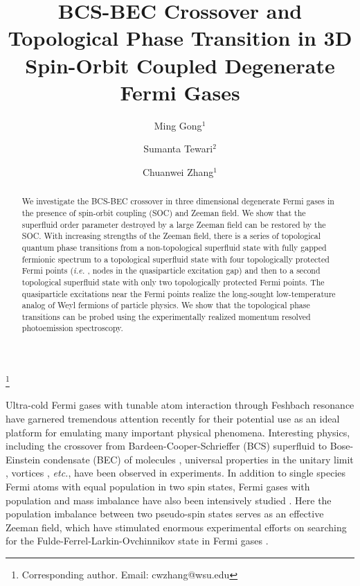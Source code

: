 \documentclass[prl,showpacs,twocolumn]{revtex4-1}
\begin{document}
\title{BCS-BEC Crossover and Topological Phase Transition in 3D Spin-Orbit
Coupled Degenerate Fermi Gases}
\author{Ming Gong$^{1}$}
\author{Sumanta Tewari$^{2}$}
\author{Chuanwei Zhang$^{1}$}
\thanks{Corresponding author. Email: cwzhang@wsu.edu}

\begin{abstract}
We investigate the BCS-BEC crossover in three dimensional degenerate Fermi
gases in the presence of spin-orbit coupling (SOC) and Zeeman field. We show
that the superfluid order parameter destroyed by a large Zeeman field can be
restored by the SOC. With increasing strengths of the Zeeman field, there is
a series of topological quantum phase transitions from a non-topological
superfluid state with fully gapped fermionic spectrum to a topological
superfluid state with four topologically protected Fermi points (\textit{i.e.%
}, nodes in the quasiparticle excitation gap) and then to a second
topological superfluid state with only two topologically protected Fermi
points. The quasiparticle excitations near the Fermi points realize the
long-sought low-temperature analog of Weyl fermions of particle physics. We
show that the topological phase transitions can be probed using the
experimentally realized momentum resolved photoemission spectroscopy.
\end{abstract}
\maketitle



Ultra-cold Fermi gases with tunable atom interaction through Feshbach
resonance \cite{Chin10} have garnered tremendous attention recently \cite%
{Review1} for their potential use as an ideal platform for emulating many
important physical phenomena. Interesting physics, including the crossover
from Bardeen-Cooper-Schrieffer (BCS) superfluid to Bose-Einstein condensate
(BEC) of molecules \cite{BCS-BEC}, universal properties in the unitary limit
\cite{Unitary}, vortices \cite{Vortices}, \textit{etc.}, have been observed
in experiments. In addition to single species Fermi atoms with equal
population in two spin states, Fermi gases with population and mass
imbalance have also been intensively studied \cite{Popimb1,Popimb2,Massimb1}%
. Here the population imbalance between two pseudo-spin states serves as an
effective Zeeman field, which have stimulated enormous experimental efforts
on searching for the Fulde-Ferrel-Larkin-Ovchinnikov state in Fermi gases
\cite{FFLO}.
\end{document}
